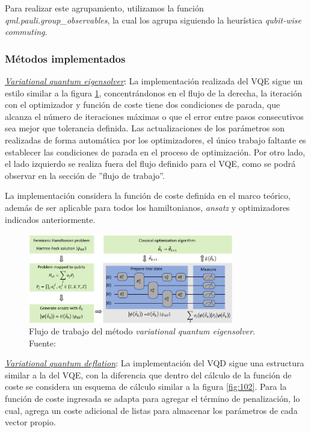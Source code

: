 Para realizar este agrupamiento, utilizamos la función \textit{qml.pauli.group\_observables}, la cual los agrupa siguiendo la heurística \textit{qubit-wise commuting}.



%
%
%
%
%
\subsubsection{Métodos implementados}
 
\underline{\textit{Variational quantum eigensolver}}: 
La implementación realizada del VQE sigue un estilo similar a la figura \ref{fig:101}, concentrándonos en el flujo de la derecha, la iteración con el optimizador y función de coste tiene dos condiciones de parada, que alcanza el número de iteraciones máximas o que el error entre pasos consecutivos sea mejor que tolerancia definida. Las actualizaciones de los parámetros son realizadas de forma automática por los optimizadores, el único trabajo faltante es establecer las condiciones de parada en el proceso de optimización. Por otro lado, el lado izquierdo se realiza fuera del flujo definido para el VQE, como se podrá observar en la sección de ''flujo de trabajo''. 

La implementación considera la función de coste definida en el marco teórico, además de ser aplicable para todos los hamiltonianos, \textit{ansatz} y optimizadores indicados anteriormente.

\begin{figure}[H]
\centering
\includegraphics[width=0.8\textwidth]{figures/S3/flujovqe.png}
\caption{\label{fig:101} Flujo de trabajo del método \textit{variational quantum eigensolver}. Fuente: \cite{Fedorov2022}}
\end{figure}

\underline{\textit{Variational quantum deflation}}: 
La implementación del VQD sigue una estructura similar a la del VQE, con la diferencia que dentro del cálculo de la función de coste se considera un esquema de cálculo similar a la figura \ref{fig:102}. Para la función de coste ingresada se adapta para agregar el término de penalización, lo cual, agrega un coste adicional de listas para almacenar los parámetros de cada vector propio.

